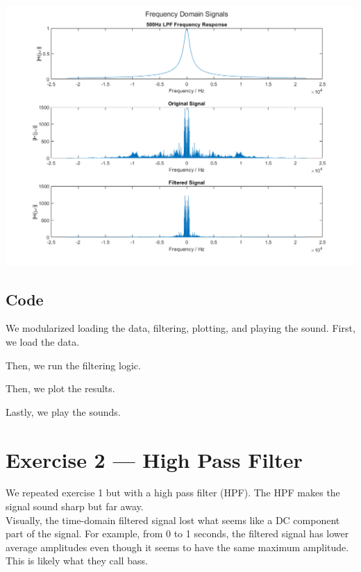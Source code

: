 \documentclass[11pt]{article}
\begin{document}
\includegraphics[height=0.5\textheight]{lpf_frequency.png}

\subsection{Code}
We modularized loading the data, filtering, plotting, and playing the sound.
First, we load the data.



Then, we run the filtering logic.



Then, we plot the results.



Lastly, we play the sounds.



\section{Exercise 2 --- High Pass Filter}

We repeated exercise 1 but with a high pass filter (HPF).
The HPF makes the signal sound sharp but far away.\\

Visually, the time-domain filtered signal lost 
what seems like a DC component part of the signal. 
For example, from 0 to 1 seconds, the filtered signal has lower
average amplitudes even though it seems to have the same maximum amplitude.
This is likely what they call bass.\\
\end{document}
